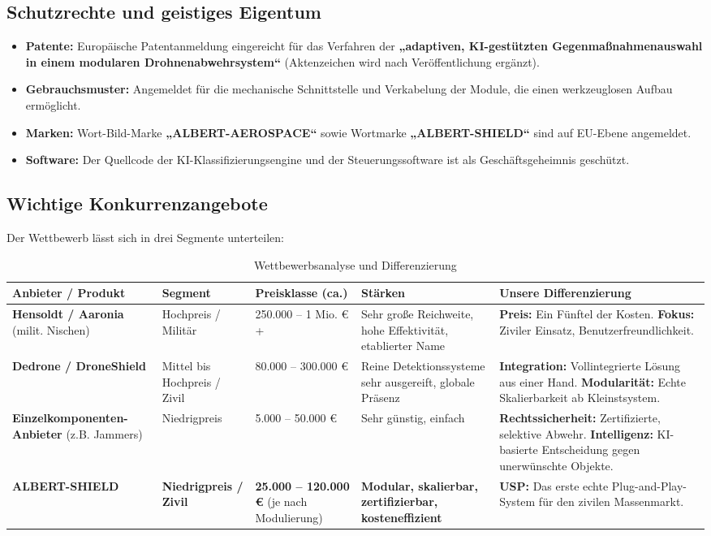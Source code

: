 \documentclass[11pt,a4paper]{article}
\begin{document}
\subsection{Schutzrechte und geistiges Eigentum}
\begin{itemize}
    \item \textbf{Patente:} Europäische Patentanmeldung eingereicht für das Verfahren der \textbf{„adaptiven, KI-gestützten Gegenmaßnahmenauswahl in einem modularen Drohnenabwehrsystem“} (Aktenzeichen wird nach Veröffentlichung ergänzt).
    \item \textbf{Gebrauchsmuster:} Angemeldet für die mechanische Schnittstelle und Verkabelung der Module, die einen werkzeuglosen Aufbau ermöglicht.
    \item \textbf{Marken:} Wort-Bild-Marke \textbf{„ALBERT-AEROSPACE“} sowie Wortmarke \textbf{„ALBERT-SHIELD“} sind auf EU-Ebene angemeldet.
    \item \textbf{Software:} Der Quellcode der KI-Klassifizierungsengine und der Steuerungssoftware ist als Geschäftsgeheimnis geschützt.
\end{itemize}

\subsection{Wichtige Konkurrenzangebote}
Der Wettbewerb lässt sich in drei Segmente unterteilen:

\begin{table}[ht]
\centering
\begin{tabularx}{\textwidth}{lYYYY}
\toprule
\textbf{Anbieter / Produkt} & \textbf{Segment} & \textbf{Preisklasse (ca.)} & \textbf{Stärken} & \textbf{Unsere Differenzierung} \\
\midrule
\textbf{Hensoldt / Aaronia} (milit. Nischen) & Hochpreis / Militär & 250.000 – 1 Mio. €+ & Sehr große Reichweite, hohe Effektivität, etablierter Name & \textbf{Preis:} Ein Fünftel der Kosten. \textbf{Fokus:} Ziviler Einsatz, Benutzerfreundlichkeit. \\
\addlinespace
\textbf{Dedrone / DroneShield} & Mittel bis Hochpreis / Zivil & 80.000 – 300.000 € & Reine Detektionssysteme sehr ausgereift, globale Präsenz & \textbf{Integration:} Vollintegrierte Lösung aus einer Hand. \textbf{Modularität:} Echte Skalierbarkeit ab Kleinstsystem. \\
\addlinespace
\textbf{Einzelkomponenten-Anbieter} (z.B. Jammers) & Niedrigpreis & 5.000 – 50.000 € & Sehr günstig, einfach & \textbf{Rechtssicherheit:} Zertifizierte, selektive Abwehr. \textbf{Intelligenz:} KI-basierte Entscheidung gegen unerwünschte Objekte. \\
\addlinespace
\textbf{ALBERT-SHIELD} & \textbf{Niedrigpreis / Zivil} & \textbf{25.000 – 120.000 €} (je nach Modulierung) & \textbf{Modular, skalierbar, zertifizierbar, kosteneffizient} & \textbf{USP:} Das erste echte Plug-and-Play-System für den zivilen Massenmarkt. \\
\bottomrule
\end{tabularx}
\caption{Wettbewerbsanalyse und Differenzierung}
\end{table}
\end{document}
